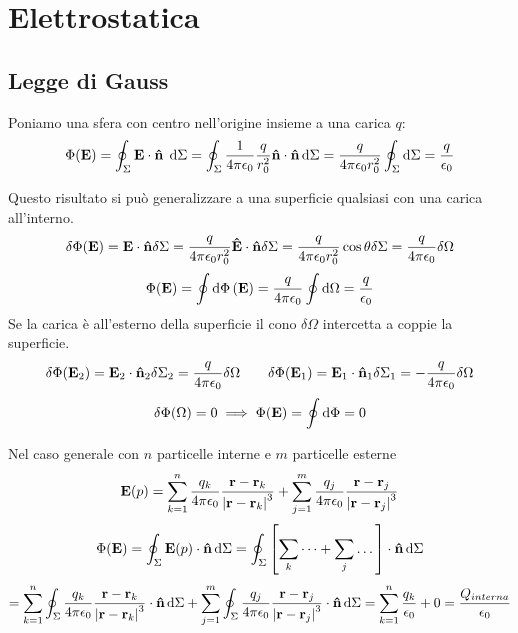 \documentclass[12pt,a4paper]{article}
\begin{document}
\section{Elettrostatica}
\subsection{Legge di Gauss }
Poniamo una sfera con centro nell'origine insieme a una carica $q$:
\begin{equation*}
    \Phi(\vb{E})= \oint_\Sigma \vb{E}\cdot \vu{n} \; \dd{\Sigma} = \oint_\Sigma \frac{1}{4\pi\epsilon_0}\frac{q}{r_0^2}\vu{n}\cdot\vu{n}\dd{\Sigma}= 
    \frac{q}{4\pi\epsilon_0r_0^2}\oint_\Sigma \dd{\Sigma} = \frac{q}{\epsilon_0}
\end{equation*}

Questo risultato si può generalizzare a una superficie qualsiasi con una carica all'interno.
\begin{equation*}
    \delta\Phi(\vb{E})= \vb{E}\cdot\vu{n} \delta \Sigma = \frac{q}{4\pi\epsilon_0r_0^2}\vu{E}\cdot\vu{n} \delta\Sigma= 
     \frac{q}{4\pi\epsilon_0r_0^2}\cos \theta \delta\Sigma=  \frac{q}{4\pi\epsilon_0} \delta\Omega
\end{equation*}
\begin{equation*}
    \Phi(\vb{E})= \oint \dd{\Phi}(\vb{E})=\frac{q}{4\pi\epsilon_0} \oint\dd{\Omega} = \frac{q}{\epsilon_0}
\end{equation*}
Se la carica è all'esterno della superficie il cono $\delta\Omega$ intercetta a coppie la superficie. 
\begin{equation*}
    \delta\Phi(\vb{E}_2)= \vb{E}_2 \cdot\vu{n}_2 \delta\Sigma_2 =  \frac{q}{4\pi\epsilon_0} \delta\Omega
    \quad \quad \delta\Phi(\vb{E}_1)= \vb{E}_1 \cdot\vu{n}_1 \delta\Sigma_1 =  - \frac{q}{4\pi\epsilon_0} \delta\Omega
\end{equation*}
\begin{equation*}
    \delta\Phi(\Omega)= 0 \implies \Phi(\vb{E})= \oint \dd{\Phi}=0
\end{equation*}

Nel caso generale con $n$ particelle interne e $m$ particelle esterne
\begin{equation*}
    \vb{E}(p)= \sum_{k=1}^{n} \frac{q_k}{4\pi\epsilon_0} \frac{\vb{r}-\vb{r}_k}{\abs{\vb{r}-\vb{r}_k}^3} +
    \sum_{j=1}^{m} \frac{q_j}{4\pi\epsilon_0} \frac{\vb{r}-\vb{r}_j}{\abs{\vb{r}-\vb{r}_j}^3} 
\end{equation*}
\begin{equation*}
    \Phi(\vb{E})= \oint_\Sigma \vb{E}(p)\cdot\vu{n} \dd{\Sigma} = \oint_\Sigma \left[ \sum_k \dots + \sum_j \dots  \right]\cdot\vu{n} \dd{\Sigma} 
\end{equation*}
\begin{equation*}
    =\sum_{k=1}^{n} \oint_\Sigma\frac{q_k}{4\pi\epsilon_0} \frac{\vb{r}-\vb{r}_k}{\abs{\vb{r}-\vb{r}_k}^3} \cdot\vu{n}\dd{\Sigma} +
    \sum_{j=1}^{m} \oint_\Sigma\frac{q_j}{4\pi\epsilon_0} \frac{\vb{r}-\vb{r}_j}{\abs{\vb{r}-\vb{r}_j}^3}\cdot\vu{n} \dd{\Sigma} 
    = \sum_{k=1}^{n} \frac{q_k}{\epsilon_0} + 0 = \frac{Q_{interna}}{\epsilon_0}
\end{equation*}
\end{document}

